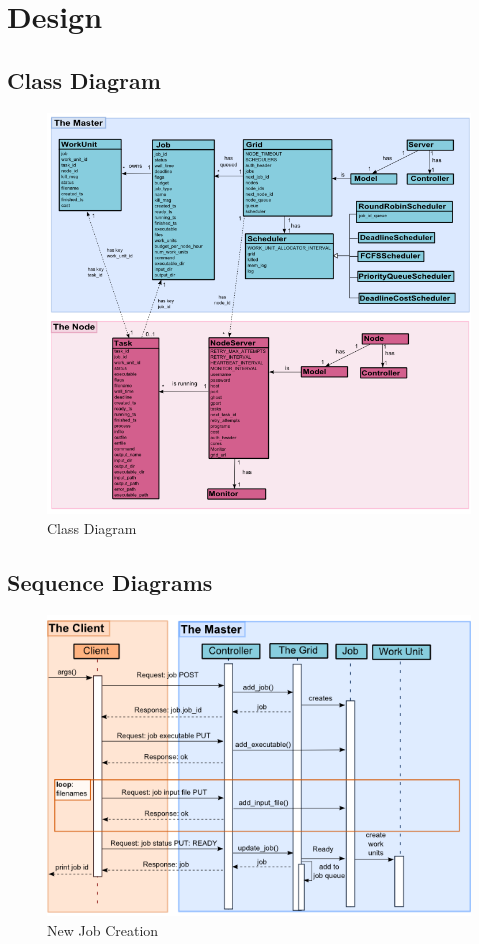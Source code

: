 \chapter{Design}

\section{Class Diagram}

\begin{figure}[htbp]
\centering
\includegraphics[keepaspectratio,width=\textwidth,height=0.75\textheight]{./figs/class.png}
\caption{Class Diagram}
\end{figure}

\section{Sequence Diagrams}

\begin{figure}[htbp]
\centering
\includegraphics[keepaspectratio,width=\textwidth,height=0.75\textheight]{./figs/jobcreate.png}
\caption{New Job Creation}
\end{figure}


